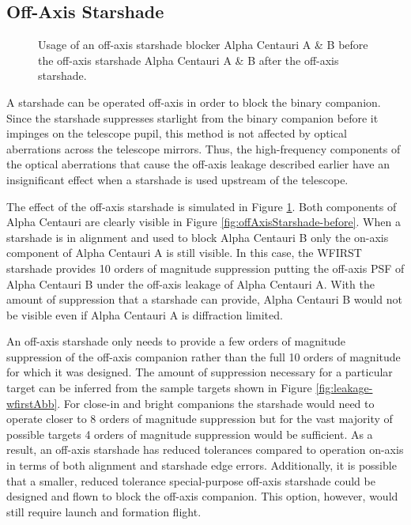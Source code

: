 \documentclass[]{spie}  %
\begin{document}
\subsection{Off-Axis Starshade} \label{sect:offAxisStarshade}

\begin{figure}[b!]
\centering
{}
\caption[Companion Leakage]
{\label{fig:offAxisStarshade} Usage of an off-axis starshade blocker  Alpha Centauri A \& B before the off-axis starshade  Alpha Centauri A \& B after the off-axis starshade.}
\end{figure}

A starshade can be operated off-axis in order to block the binary companion. Since the starshade suppresses starlight from the binary companion before it impinges on the telescope pupil, this method is not affected by optical aberrations across the telescope mirrors. Thus, the high-frequency components of the optical aberrations that cause the off-axis leakage described earlier have an insignificant effect when a starshade is used upstream of the telescope. 

The effect of the off-axis starshade is simulated in Figure \ref{fig:offAxisStarshade}. Both components of Alpha Centauri are clearly visible in Figure \ref{fig:offAxisStarshade-before}. When a starshade is in alignment and used to block Alpha Centauri B only the on-axis component of Alpha Centauri A is still visible. In this case, the WFIRST starshade provides 10 orders of magnitude suppression putting the off-axis PSF of Alpha Centauri B under the off-axis leakage of Alpha Centauri A. With the amount of suppression that a starshade can provide, Alpha Centauri B would not be visible even if Alpha Centauri A is diffraction limited. 

An off-axis starshade only needs to provide a few orders of magnitude suppression of the off-axis companion rather than the full 10 orders of magnitude for which it was designed. The amount of suppression necessary for a particular target can be inferred from the sample targets shown in Figure \ref{fig:leakage-wfirstAbb}. For close-in and bright companions the starshade would need to operate closer to 8 orders of magnitude suppression but for the vast majority of possible targets 4 orders of magnitude suppression would be sufficient. As a result, an off-axis starshade has reduced tolerances compared to operation on-axis in terms of both alignment and starshade edge errors. Additionally, it is possible that a smaller, reduced tolerance special-purpose off-axis starshade could be designed and flown to block the off-axis companion. This option, however, would still require launch and formation flight. 
\end{document}
